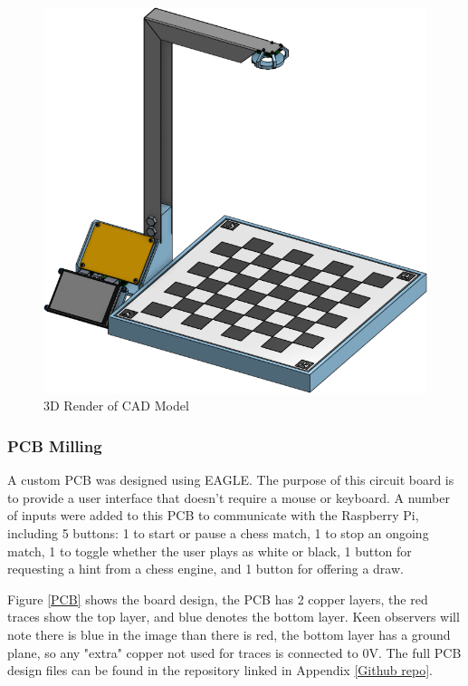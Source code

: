 \documentclass[journal]{IEEEtran}
\begin{document}
\begin{figure}[!ht]
	\centering
	\includegraphics[width=\linewidth]{Images/Render.png}
	\caption{3D Render of CAD Model}
	\label{render}
\end{figure}

\vspace{12pt}

\subsubsection{PCB Milling}
A custom PCB was designed using EAGLE. The purpose of this circuit board is to provide a user interface that doesn't require a mouse or keyboard. A number of inputs were added to this PCB to communicate with the Raspberry Pi, including 5 buttons: 1 to start or pause a chess match, 1 to stop an ongoing match, 1 to toggle whether the user plays as white or black, 1 button for requesting a hint from a chess engine, and 1 button for offering a draw.

Figure \ref{PCB} shows the board design, the PCB has 2 copper layers, the red traces show the top layer, and blue denotes the bottom layer. Keen observers will note there is blue in the image than there is red, the bottom layer has a ground plane, so any "extra" copper not used for traces is connected to 0V.
The full PCB design files can be found in the repository linked in Appendix \ref{Github repo}.
\end{document}
